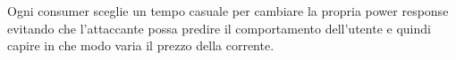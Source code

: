 Ogni consumer sceglie un tempo casuale per cambiare la propria power response evitando che l’attaccante possa predire il comportamento dell’utente e quindi capire in che modo varia il prezzo della corrente.
